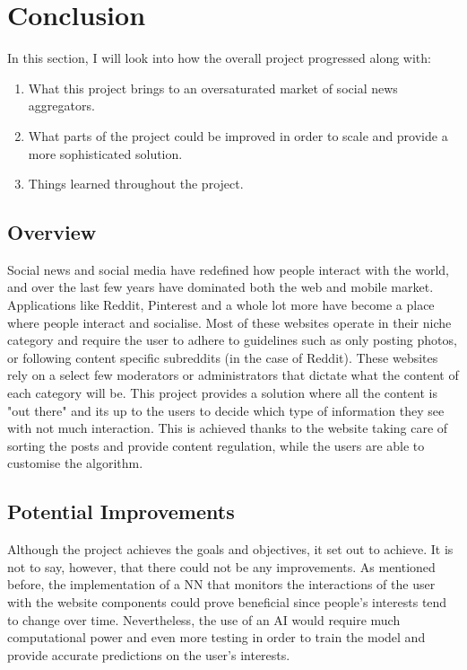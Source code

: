 
\chapter {Conclusion}

In this section, I will look into how the overall  project progressed along with:

\begin{enumerate}
  \item What this project brings to an oversaturated market of social news aggregators.
  \item What parts of the project could be improved in order to scale and provide a more sophisticated solution.
  \item Things learned throughout the project.
\end{enumerate}

\section{Overview}

Social news and social media have redefined how people interact with the world, and over the last few years have dominated both the web and mobile market. Applications like Reddit, Pinterest and a whole lot more have become a place where people interact and socialise. Most of these websites operate in their niche category and require the user to adhere to guidelines such as only posting photos, or following content specific subreddits (in the case of Reddit). These websites rely on a select few moderators or administrators that dictate what the content of each category will be. This project provides a solution where all the content is "out there" and its up to the users to decide which type of information they see with not much interaction. This is achieved thanks to the website taking care of sorting the posts and provide content regulation, while the users are able to customise the algorithm.

\section{Potential Improvements}

Although the project achieves the goals and objectives, it set out to achieve. It is not to say, however, that there could not be any improvements. As mentioned before, the implementation of a NN that monitors the interactions of the user with the website components could prove beneficial since people's interests tend to change over time. Nevertheless, the use of an AI would require much computational power and even more testing in order to train the model and provide accurate predictions on the user's interests.

